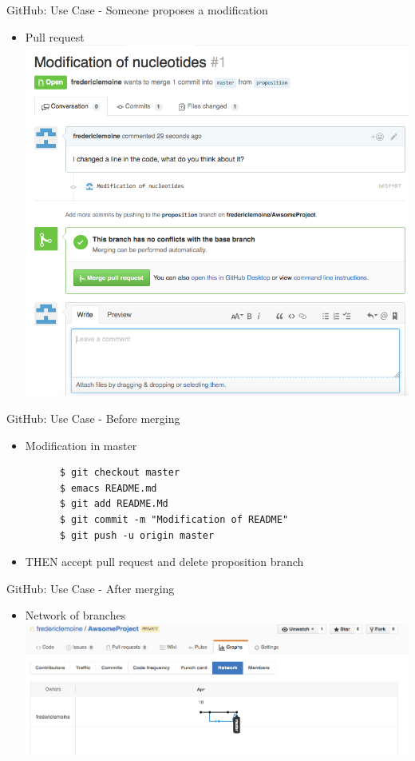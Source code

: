 \begin{frame}[fragile]{GitHub: Use Case - Someone proposes a modification}
  \begin{itemize}
  \item Pull request
    \includegraphics[width=\textwidth]{images/hosting_services_use_case_8.png}
  \end{itemize}
\end{frame}


\begin{frame}[fragile]{GitHub: Use Case - Before merging}
  \begin{itemize}
  \item Modification in master
    \begin{lstlisting}
      $ git checkout master
      $ emacs README.md
      $ git add README.Md
      $ git commit -m "Modification of README"
      $ git push -u origin master
    \end{lstlisting}
  \item THEN accept pull request and delete proposition branch
  \end{itemize}
\end{frame}


\begin{frame}[fragile]{GitHub: Use Case - After merging}
  \begin{itemize}
  \item Network of branches
    \includegraphics[width=\textwidth]{images/hosting_services_use_case_9.png}
  \end{itemize}
\end{frame}


